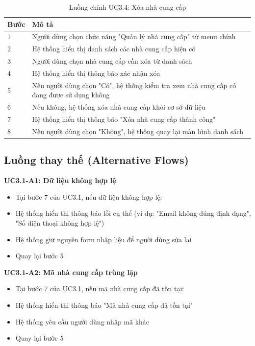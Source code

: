 \documentclass[a4paper,12pt]{article}
\begin{document}
\begin{table}[h]
\centering
\renewcommand{\arraystretch}{0.85}
\begin{tabular}{|p{1.5cm}|p{10cm}|}
\hline
\textbf{Bước} & \textbf{Mô tả} \\
\hline
1 & Người dùng chọn chức năng "Quản lý nhà cung cấp" từ menu chính \\
\hline
2 & Hệ thống hiển thị danh sách các nhà cung cấp hiện có \\
\hline
3 & Người dùng chọn nhà cung cấp cần xóa từ danh sách \\
\hline
4 & Hệ thống hiển thị thông báo xác nhận xóa \\
\hline
5 & Nếu người dùng chọn "Có", hệ thống kiểm tra xem nhà cung cấp có đang được sử dụng không \\
\hline
6 & Nếu không, hệ thống xóa nhà cung cấp khỏi cơ sở dữ liệu \\
\hline
7 & Hệ thống hiển thị thông báo "Xóa nhà cung cấp thành công" \\
\hline
8 & Nếu người dùng chọn "Không", hệ thống quay lại màn hình danh sách \\
\hline
\end{tabular}
\caption{Luồng chính UC3.4: Xóa nhà cung cấp}
\end{table}

\subsection{Luồng thay thế (Alternative Flows)}

\textbf{UC3.1-A1: Dữ liệu không hợp lệ}
\begin{itemize}
    \item Tại bước 7 của UC3.1, nếu dữ liệu không hợp lệ:
    \item Hệ thống hiển thị thông báo lỗi cụ thể (ví dụ: "Email không đúng định dạng", "Số điện thoại không hợp lệ")
    \item Hệ thống giữ nguyên form nhập liệu để người dùng sửa lại
    \item Quay lại bước 5
\end{itemize}

\textbf{UC3.1-A2: Mã nhà cung cấp trùng lặp}
\begin{itemize}
    \item Tại bước 7 của UC3.1, nếu mã nhà cung cấp đã tồn tại:
    \item Hệ thống hiển thị thông báo "Mã nhà cung cấp đã tồn tại"
    \item Hệ thống yêu cầu người dùng nhập mã khác
    \item Quay lại bước 5
\end{itemize}
\end{document}

